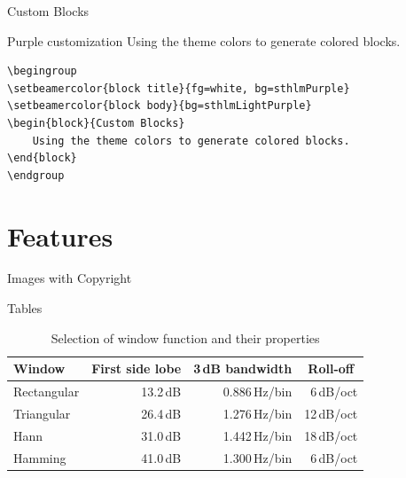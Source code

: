 \documentclass[newPxFont]{beamer}
\begin{document}

\begin{frame}[containsverbatim]{Custom Blocks}
\begingroup
{}
\begin{block}{Purple customization}
	Using the theme colors to generate colored blocks.
\end{block}
\endgroup
\begin{verbatim}
\begingroup
\setbeamercolor{block title}{fg=white, bg=sthlmPurple}
\setbeamercolor{block body}{bg=sthlmLightPurple}
\begin{block}{Custom Blocks}
    Using the theme colors to generate colored blocks.
\end{block}
\endgroup
\end{verbatim}
\end{frame}


%
%
\section{Features}


\begin{frame}{Images with Copyright}
	\begin{figure}
		\centering
	\end{figure}
\end{frame}


\begin{frame}{Tables}
\begin{table}[]
	\caption{Selection of window function and their properties}
	\begin{tabular}[]{lrrr}
		\toprule
		\textbf{Window}			& \multicolumn{1}{c}{\textbf{First side lobe}}
		                    & \multicolumn{1}{c}{\textbf{3\,dB bandwidth}}
		                    & \multicolumn{1}{c}{\textbf{Roll-off}} \\
		\midrule
		Rectangular				& 13.2\,dB	& 0.886\,Hz/bin	& 6\,dB/oct		\\[0.25em]
		Triangular				& 26.4\,dB	& 1.276\,Hz/bin	& 12\,dB/oct	\\[0.25em]
		Hann					& 31.0\,dB	& 1.442\,Hz/bin	& 18\,dB/oct	\\[0.25em]
		Hamming					& 41.0\,dB	& 1.300\,Hz/bin	& 6\,dB/oct		\\
		\bottomrule
	\end{tabular}
	\label{tab:WindowFunctions}
\end{table}
\end{frame}
\end{document}

